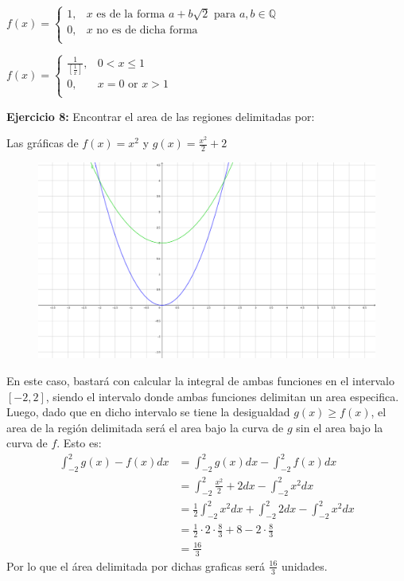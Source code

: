 \documentclass[../../main.tex]{subfiles}
\begin{document}
\begin{partes}
    \parte $f(x) = \begin{cases}
        1,& x \text{ es de la forma $a+b\sqrt{2}$ para $a, b \in \mathbb{Q}$}\\
        0,& x \text{ no es de dicha forma}\\
    \end{cases}$

    \parte $f(x) = \begin{cases}
        \frac{1}{\left[\frac{1}{x}\right]},&  0 < x \le 1\\
        0,& x = 0 \text{ or } x > 1\\
    \end{cases}$
\end{partes}

\question \textbf{Ejercicio 8:} Encontrar el area de las regiones delimitadas por:
\begin{partes}
    \parte Las gráficas de $f(x) = x^2$ y $g(x) = \frac{x^2}{2}+2$\\
    \begin{center}
        \begin{figure}[h]
            \centering
            \includegraphics{Parte 1/grafica1.png}
        \end{figure}        
    \end{center}

    En este caso, bastará con calcular la integral de ambas funciones en el intervalo $[-2, 2]$, siendo el intervalo donde
    ambas funciones delimitan un area especifica. Luego, dado que en dicho intervalo se tiene la desigualdad $g(x) \ge f(x)$,
    el area de la región delimitada será el area bajo la curva de $g$ sin el area bajo la curva de $f$. Esto es:
    \begin{align*}
        \int_{-2}^2 g(x)-f(x) dx &= \int_{-2}^2 g(x)dx - \int_{-2}^2 f(x)dx\\
        &= \int_{-2}^2 \frac{x^2}{2}+2 dx- \int_{-2}^2 x^2dx\\
        &= \frac{1}{2}\int_{-2}^2 x^2dx + \int_{-2}^2 2dx - \int_{-2}^2 x^2dx\\
        &= \frac{1}{2} \cdot 2 \cdot \frac{8}{3} + 8 - 2 \cdot \frac{8}{3}\\
        &= \frac{16}{3}
    \end{align*}
    Por lo que el área delimitada por dichas graficas será $\frac{16}{3}$ unidades.


\end{partes}
\end{document}
